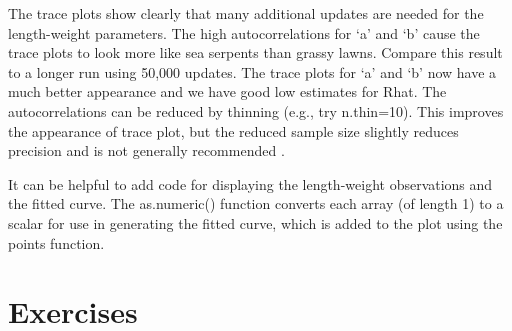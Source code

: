 \documentclass[
]{krantz}
\makeatletter
\newenvironment{Shaded}{\begin{snugshade}}{\end{snugshade}}
\newcommand{\AttributeTok}[1]{\textcolor[rgb]{0.27,0.27,0.27}{#1}}
\newcommand{\CommentTok}[1]{\textcolor[rgb]{0.37,0.37,0.37}{\textit{#1}}}
\newcommand{\FloatTok}[1]{\textcolor[rgb]{0.06,0.06,0.06}{#1}}
\newcommand{\FunctionTok}[1]{\textcolor[rgb]{0.27,0.27,0.27}{\textbf{#1}}}
\newcommand{\NormalTok}[1]{#1}
\newcommand{\OtherTok}[1]{\textcolor[rgb]{0.37,0.37,0.37}{#1}}
\newcommand{\SpecialCharTok}[1]{\textcolor[rgb]{0.43,0.43,0.43}{\textbf{#1}}}
\newcommand{\StringTok}[1]{\textcolor[rgb]{0.5,0.5,0.5}{#1}}
\newenvironment{kframe}{%
\medskip{}
\setlength{\fboxsep}{.8em}
 \def\at@end@of@kframe{}%
 \ifinner\ifhmode%
  \def\at@end@of@kframe{\end{minipage}}%
  \begin{minipage}{\columnwidth}%
 \fi\fi%
 \def\FrameCommand##1{\hskip\@totalleftmargin \hskip-\fboxsep
 \colorbox{shadecolor}{##1}\hskip-\fboxsep
     \hskip-\linewidth \hskip-\@totalleftmargin \hskip\columnwidth}%
 \MakeFramed {\advance\hsize-\width
   \@totalleftmargin\z@ \linewidth\hsize
   \@setminipage}}%
 {\par\unskip\endMakeFramed%
 \at@end@of@kframe}
\renewenvironment{Shaded}{\begin{kframe}}{\end{kframe}}
\makeatother
\begin{document}
The trace plots show clearly that many additional updates are needed for the length-weight parameters. The high autocorrelations for `a' and `b' cause the trace plots to look more like sea serpents than grassy lawns. Compare this result to a longer run using 50,000 updates. The trace plots for `a' and `b' now have a much better appearance and we have good low estimates for Rhat. The autocorrelations can be reduced by thinning (e.g., try n.thin=10). This improves the appearance of trace plot, but the reduced sample size slightly reduces precision and is not generally recommended \citep{link.eaton2012}.

It can be helpful to add code for displaying the length-weight observations and the fitted curve. The as.numeric() function converts each array (of length 1) to a scalar for use in generating the fitted curve, which is added to the plot using the points function.

\begin{Shaded}
\end{Shaded}

\hypertarget{exercises-5}{%
\section{Exercises}\label{exercises-5}}
\end{document}
